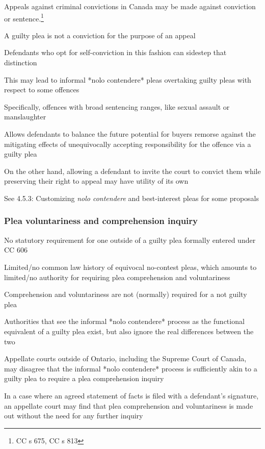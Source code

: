 Appeals against criminal convictions in Canada may be made against conviction or sentence.\footnote{CC s 675, CC s 813}

A guilty plea is not a conviction for the purpose of an appeal

Defendants who opt for self-conviction in this fashion can sidestep that distinction

This may lead to informal *nolo contendere* pleas overtaking guilty pleas with respect to some offences

Specifically, offences with broad sentencing ranges, like sexual assault or manslaughter

Allows defendants to balance the future potential for buyers remorse against the mitigating effects of unequivocally accepting responsibility for the offence via a guilty plea

On the other hand, allowing a defendant to invite the court to convict them while preserving their right to appeal may have utility of its own

See 4.5.3: Customizing \textit{nolo contendere} and best-interest pleas for some proposals

\subsubsection{Plea voluntariness and comprehension inquiry}

No statutory requirement for one outside of a guilty plea formally entered under CC 606

Limited/no common law history of equivocal no-contest pleas, which amounts to limited/no authority for requiring plea comprehension and voluntariness

Comprehension and voluntariness are not (normally) required for a not guilty plea

Authorities that see the informal *nolo contendere* process as the functional equivalent of a guilty plea exist, but also ignore the real differences between the two

Appellate courts outside of Ontario, including the Supreme Court of Canada, may disagree that the informal *nolo contendere* process is sufficiently akin to a guilty plea to require a plea comprehension inquiry

In a case where an agreed statement of facts is filed with a defendant's signature, an appellate court may find that plea comprehension and voluntariness is made out without the need for any further inquiry

